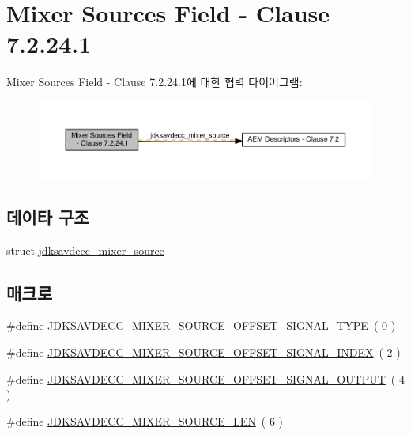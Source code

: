 \hypertarget{group__mixer__source}{}\section{Mixer Sources Field -\/ Clause 7.2.24.1}
\label{group__mixer__source}
Mixer Sources Field -\/ Clause 7.2.24.1에 대한 협력 다이어그램\+:
\nopagebreak
\begin{figure}[H]
\begin{center}
\leavevmode
\includegraphics[width=350pt]{group__mixer__source}
\end{center}
\end{figure}
\subsection*{데이타 구조}
\begin{DoxyCompactItemize}
\item 
struct \hyperlink{structjdksavdecc__mixer__source}{jdksavdecc\+\_\+mixer\+\_\+source}
\end{DoxyCompactItemize}
\subsection*{매크로}
\begin{DoxyCompactItemize}
\item 
\#define \hyperlink{group__mixer__source_ga95968d5c7647c22a9b3a25974a845e4d}{J\+D\+K\+S\+A\+V\+D\+E\+C\+C\+\_\+\+M\+I\+X\+E\+R\+\_\+\+S\+O\+U\+R\+C\+E\+\_\+\+O\+F\+F\+S\+E\+T\+\_\+\+S\+I\+G\+N\+A\+L\+\_\+\+T\+Y\+PE}~( 0 )
\item 
\#define \hyperlink{group__mixer__source_gade62772295522262439a273bad503930}{J\+D\+K\+S\+A\+V\+D\+E\+C\+C\+\_\+\+M\+I\+X\+E\+R\+\_\+\+S\+O\+U\+R\+C\+E\+\_\+\+O\+F\+F\+S\+E\+T\+\_\+\+S\+I\+G\+N\+A\+L\+\_\+\+I\+N\+D\+EX}~( 2 )
\item 
\#define \hyperlink{group__mixer__source_ga984fdbdf03d8b3b4e13119c29d3634aa}{J\+D\+K\+S\+A\+V\+D\+E\+C\+C\+\_\+\+M\+I\+X\+E\+R\+\_\+\+S\+O\+U\+R\+C\+E\+\_\+\+O\+F\+F\+S\+E\+T\+\_\+\+S\+I\+G\+N\+A\+L\+\_\+\+O\+U\+T\+P\+UT}~( 4 )
\item 
\#define \hyperlink{group__mixer__source_ga19582a125589306c00003f1d783ece52}{J\+D\+K\+S\+A\+V\+D\+E\+C\+C\+\_\+\+M\+I\+X\+E\+R\+\_\+\+S\+O\+U\+R\+C\+E\+\_\+\+L\+EN}~( 6 )
\end{DoxyCompactItemize}
